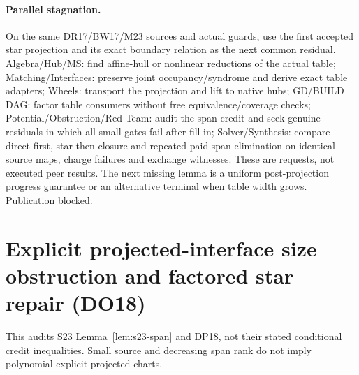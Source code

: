 \documentclass[11pt]{article}
\begin{document}
\paragraph{Parallel stagnation.}
On the same DR17/BW17/M23 sources and actual guards, use the first accepted star projection and its exact boundary relation as the next common residual. Algebra/Hub/MS: find affine-hull or nonlinear reductions of the actual table; Matching/Interfaces: preserve joint occupancy/syndrome and derive exact table adapters; Wheels: transport the projection and lift to native hubs; GD/BUILD DAG: factor table consumers without free equivalence/coverage checks; Potential/Obstruction/Red Team: audit the span-credit and seek genuine residuals in which all small gates fail after fill-in; Solver/Synthesis: compare direct-first, star-then-closure and repeated paid span elimination on identical source maps, charge failures and exchange witnesses. These are requests, not executed peer results. The next missing lemma is a uniform post-projection progress guarantee or an alternative terminal when table width grows. Publication blocked.


\section{Explicit projected-interface size obstruction and factored star repair (DO18)}\label{sec:do18}
This audits S23 Lemma~\ref{lem:s23-span} and DP18, not their stated conditional credit inequalities. Small source and decreasing span rank do not imply polynomial explicit projected charts.
\end{document}
